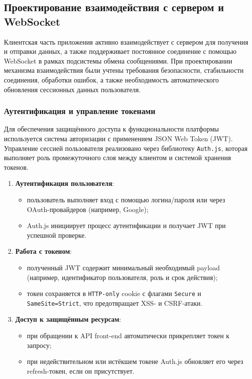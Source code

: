 \subsection{Проектирование взаимодействия с сервером и WebSocket}

Клиентская часть приложения активно взаимодействует с сервером для получения и отправки данных, а также поддерживает постоянное соединение с помощью WebSocket в рамках подсистемы обмена сообщениями. При проектировании механизма взаимодействия были учтены требования безопасности, стабильности соединения, обработки ошибок, а также необходимость автоматического обновления сессионных данных пользователя.

\subsubsection{Аутентификация и управление токенами}
Для обеспечения защищённого доступа к функциональности платформы используется система авторизации с применением JSON Web Token (JWT). Управление сессией пользователя реализовано через библиотеку \texttt{Auth.js}, которая выполняет роль промежуточного слоя между клиентом и системой хранения токенов.

\begin{enumerate}
  \item \textbf{Аутентификация пользователя}:
  \begin{itemize}
    \item пользователь выполняет вход с помощью логина/пароля или через OAuth-провайдеров (например, Google);
    \item Auth.js инициирует процесс аутентификации и получает JWT при успешной проверке.
  \end{itemize}
  
  \item \textbf{Работа с токеном}:
  \begin{itemize}
    \item полученный JWT содержит минимальный необходимый payload (например, идентификатор пользователя, роль и срок действия);
    \item токен сохраняется в \texttt{HTTP-only} cookie с флагами \texttt{Secure} и \texttt{SameSite=Strict}, что предотвращает XSS- и CSRF-атаки.
  \end{itemize}
  
  \item \textbf{Доступ к защищённым ресурсам}:
  \begin{itemize}
    \item при обращении к API front-end автоматически прикрепляет токен к запросу;
    \item при недействительном или истёкшем токене Auth.js обновляет его через refresh-токен, если он присутствует.
  \end{itemize}
\end{enumerate}

